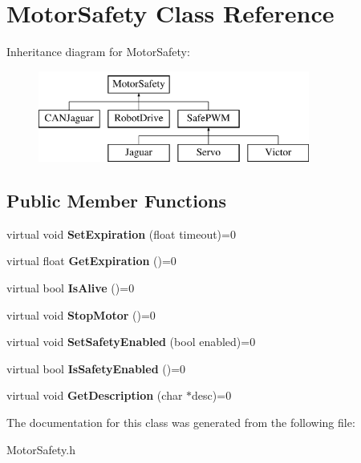 \hypertarget{classMotorSafety}{
\section{MotorSafety Class Reference}
\label{classMotorSafety}
}
Inheritance diagram for MotorSafety:\begin{figure}[H]
\begin{center}
\leavevmode
\includegraphics[height=3.000000cm]{classMotorSafety}
\end{center}
\end{figure}
\subsection*{Public Member Functions}
\begin{DoxyCompactItemize}
\item 
\hypertarget{classMotorSafety_a63f5e664f03d4f2c2501a5c191c326bc}{
virtual void {\bfseries SetExpiration} (float timeout)=0}
\label{classMotorSafety_a63f5e664f03d4f2c2501a5c191c326bc}

\item 
\hypertarget{classMotorSafety_a20bd2a8265b40cbf9311f139265a4c07}{
virtual float {\bfseries GetExpiration} ()=0}
\label{classMotorSafety_a20bd2a8265b40cbf9311f139265a4c07}

\item 
\hypertarget{classMotorSafety_a4a4ffeb12291f582e1166d05c0bfbe7c}{
virtual bool {\bfseries IsAlive} ()=0}
\label{classMotorSafety_a4a4ffeb12291f582e1166d05c0bfbe7c}

\item 
\hypertarget{classMotorSafety_a4efa2234874ade30cc093118b96b42e1}{
virtual void {\bfseries StopMotor} ()=0}
\label{classMotorSafety_a4efa2234874ade30cc093118b96b42e1}

\item 
\hypertarget{classMotorSafety_addc7856cb3e0c51385efc81d5e659ada}{
virtual void {\bfseries SetSafetyEnabled} (bool enabled)=0}
\label{classMotorSafety_addc7856cb3e0c51385efc81d5e659ada}

\item 
\hypertarget{classMotorSafety_ac228a47e2638afb7e65de916195b180d}{
virtual bool {\bfseries IsSafetyEnabled} ()=0}
\label{classMotorSafety_ac228a47e2638afb7e65de916195b180d}

\item 
\hypertarget{classMotorSafety_a20af8d449a89fd44b9a98e05c4fd3b06}{
virtual void {\bfseries GetDescription} (char $\ast$desc)=0}
\label{classMotorSafety_a20af8d449a89fd44b9a98e05c4fd3b06}

\end{DoxyCompactItemize}


The documentation for this class was generated from the following file:\begin{DoxyCompactItemize}
\item 
MotorSafety.h\end{DoxyCompactItemize}
